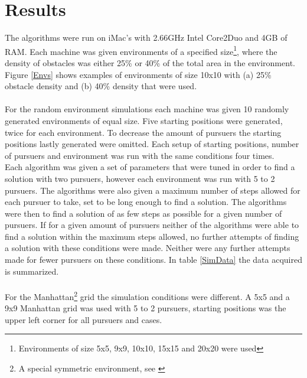 \chapter{Results}
The algorithms were run on iMac's with 2.66GHz Intel Core2Duo and 4GB of RAM. Each machine was given environments of a specified size\footnote{Environments of size 5x5, 9x9, 10x10, 15x15 and 20x20 were used}, where the density of obstacles was either 25\% or 40\% of the total area in the environment. Figure \ref{Envs} shows examples of environments of size 10x10 with (a) 25\% obstacle density and (b) 40\% density that were used.\\
\\For the random environment simulations each machine was given 10 randomly generated environments of equal size. Five starting positions were generated, twice for each environment. To decrease the amount of pursuers the starting positions lastly generated were omitted. Each setup of starting positions, number of pursuers and environment was run with the same conditions four times. \\
Each algorithm was given a set of parameters that were tuned in order to find a solution with two pursuers, however each environment was run with 5 to 2 pursuers. The algorithms were also given a maximum number of steps allowed for each pursuer to take, set to be long enough to find a solution. The algorithms were then to find a solution of as few steps as possible for a given number of pursuers. If for a given amount of pursuers neither of the algorithms were able to find a solution within the maximum steps allowed, no further attempts of finding a solution with these conditions were made. Neither were any further attempts made for fewer pursuers on these conditions. In table \ref{SimData} the data acquired is summarized.\\
\\For the Manhattan\footnote{A special symmetric environment, see \cite{paper1}} grid the simulation conditions were different. A 5x5 and a 9x9 Manhattan grid was used with 5 to 2 pursuers, starting positions was the upper left corner for all pursuers and cases.\\
